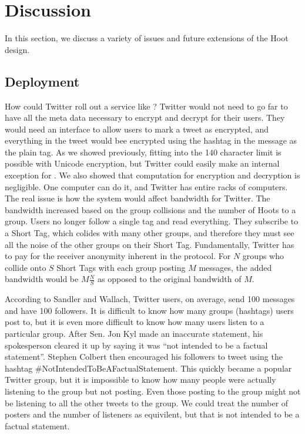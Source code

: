 \section{Discussion} \label{sec:discuss}

In this section, we discuss a variety of issues and future extensions of the Hoot design.

\subsection{Deployment}

How could Twitter roll out a service like \hoot? Twitter would not need to go far to have all the meta data necessary to encrypt and decrypt for their users. They would need an interface to allow users to mark a tweet as encrypted, and everything in the tweet would bee encrypted using the hashtag in the message as the plain tag. As we showed previously, fitting into the 140 character limit is possible with Unicode encryption, but Twitter could easily make an internal exception for \hoot. We also showed that computation for encryption and decryption is negligible. One computer can do it, and Twitter has entire racks of computers. The real issue is how the \hoot system would affect bandwidth for Twitter. The bandwidth increased based on the group collisions and the number of Hoots to a group. Users no longer follow a single tag and read everything. They subscribe to a Short Tag, which colides with many other groups, and therefore they must see all the noise of the other groups on their Short Tag. Fundamentally, Twitter has to pay for the receiver anonymity inherent in the \hoot protocol.  For $N$ groups who collide onto $S$ Short Tags with each group posting $M$ messages, the added bandwidth would be $M\frac{N}{S}$ as opposed to the original bandwidth of $M$. 

According to Sandler and Wallach\cite{sandler09}, Twitter users, on average, send 100 messages and have 100 followers. It is difficult to know how many groups (hashtags) users post to, but it is even more difficult to know how many users listen to a particular group. After Sen. Jon Kyl made an inaccurate statement, his spokesperson cleared it up by saying it was ``not intended to be a factual statement''\cite{politico11}. Stephen Colbert then encouraged his followers to tweet using the hashtag \#NotIntendedToBeAFactualStatement. This quickly became a popular Twitter group, but it is impossible to know how many people were actually listening to the group but not posting. Even those posting to the group might not be listening to all the other tweets to the group. We could treat the number of posters and the number of listeners as equivilent, but that is not intended to be a factual statement.

